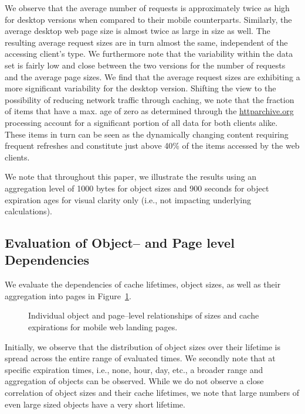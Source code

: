 \documentclass[letterpaper,conference]{IEEEtran}
\begin{document}
We observe that the average number of requests is approximately twice as high for desktop versions when compared to their mobile counterparts. Similarly, the average desktop web page size is almost twice as large in size as well. The resulting average request sizes are in turn almost the same, independent of the accessing client's type.
We furthermore note that the variability within the data set is fairly low and close between the two versions for the number of requests and the average page sizes.
We find that the average request sizes are exhibiting a more significant variability for the desktop version. 
Shifting the view to the possibility of reducing network traffic through caching, we note that the fraction of items that have a max. age of zero as determined through the \url{httparchive.org} processing account for a significant portion of all data for both clients alike. These items in turn can be seen as the dynamically changing content requiring frequent refreshes and constitute just above 40\% of the items accessed by the web clients.

We note that throughout this paper, we illustrate the results using an aggregation level of 1000 bytes for object sizes and 900 seconds for object expiration ages for visual clarity only (i.e., not impacting underlying calculations).

\subsection{Evaluation of Object-- and Page level Dependencies}
We evaluate the dependencies of cache lifetimes, object sizes, as well as their aggregation into pages in Figure~\ref{fig:rel}.
\begin{figure}[]
	\centering
	\qquad
	\caption{Individual object and page--level relationships of sizes and cache expirations for mobile web landing pages.\label{fig:rel}}
\end{figure}
Initially, we observe that the distribution of object sizes over their lifetime is spread across the entire range of evaluated times. 
We secondly note that at specific expiration times, i.e., none, hour, day, etc., a broader range and aggregation of objects can be observed. 
While we do not observe a close correlation of object sizes and their cache lifetimes, we note that large numbers of even large sized objects have a very short lifetime.
\end{document}
